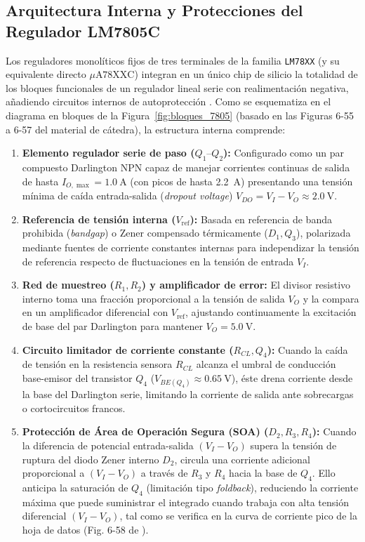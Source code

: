 \subsection{Arquitectura Interna y Protecciones del Regulador LM7805C}
Los reguladores monolíticos fijos de tres terminales de la familia \texttt{LM78XX} (y su equivalente directo $\mu\text{A78XXC}$) integran en un único chip de silicio la totalidad de los bloques funcionales de un regulador lineal serie con realimentación negativa, añadiendo circuitos internos de autoprotección \cite{gonzalez_p3}. Como se esquematiza en el diagrama en bloques de la Figura~\ref{fig:bloques_7805} (basado en las Figuras 6-55 a 6-57 del material de cátedra), la estructura interna comprende:
\begin{enumerate}
    \item \textbf{Elemento regulador serie de paso ($Q_1\text{--}Q_2$):} Configurado como un par compuesto Darlington NPN capaz de manejar corrientes continuas de salida de hasta $I_{O,\max} = \SI{1,0}{\ampere}$ (con picos de hasta \SI{2,2}{\ampere}) presentando una tensión mínima de caída entrada-salida (\emph{dropout voltage}) $V_{DO} = V_I - V_O \approx \SI{2,0}{\volt}$.
    \item \textbf{Referencia de tensión interna ($V_{\text{ref}}$):} Basada en referencia de banda prohibida (\emph{bandgap}) o Zener compensado térmicamente ($D_1, Q_3$), polarizada mediante fuentes de corriente constantes internas para independizar la tensión de referencia respecto de fluctuaciones en la tensión de entrada $V_I$.
    \item \textbf{Red de muestreo ($R_1, R_2$) y amplificador de error:} El divisor resistivo interno toma una fracción proporcional a la tensión de salida $V_O$ y la compara en un amplificador diferencial con $V_{\text{ref}}$, ajustando continuamente la excitación de base del par Darlington para mantener $V_O = \SI{5,0}{\volt}$.
    \item \textbf{Circuito limitador de corriente constante ($R_{CL}, Q_4$):} Cuando la caída de tensión en la resistencia sensora $R_{CL}$ alcanza el umbral de conducción base-emisor del transistor $Q_4$ ($V_{BE(Q_4)} \approx \SI{0,65}{\volt}$), éste drena corriente desde la base del Darlington serie, limitando la corriente de salida ante sobrecargas o cortocircuitos francos.
    \item \textbf{Protección de Área de Operación Segura (SOA) ($D_2, R_3, R_4$):} Cuando la diferencia de potencial entrada-salida $(V_I - V_O)$ supera la tensión de ruptura del diodo Zener interno $D_2$, circula una corriente adicional proporcional a $(V_I - V_O)$ a través de $R_3$ y $R_4$ hacia la base de $Q_4$. Ello anticipa la saturación de $Q_4$ (limitación tipo \emph{foldback}), reduciendo la corriente máxima que puede suministrar el integrado cuando trabaja con alta tensión diferencial $(V_I - V_O)$, tal como se verifica en la curva de corriente pico de la hoja de datos (Fig. 6-58 de \cite{gonzalez_p3}).

\end{enumerate}
